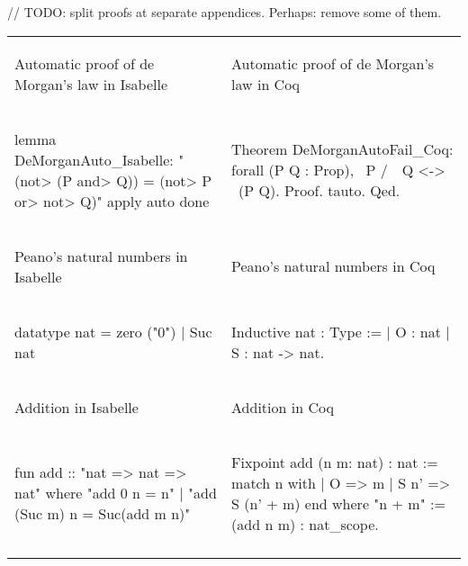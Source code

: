 \documentclass[article]{aaltoseries}
\begin{document}
// TODO: split proofs at separate appendices. Perhaps: remove some of them.

\label{appx_diff_table}

\bgroup
\def\arraystretch{0}%
\begin{tabular}{p{.45\linewidth} p{.45\linewidth}}

\begin{center}Automatic proof of de Morgan's law in Isabelle\end{center}  &  \begin{center}Automatic proof of de Morgan's law in Coq\end{center} \\
\begin{isabelle}
    lemma DeMorganAuto_Isabelle:
    "(\<not> (P \<and> Q)) = (\<not> P \<or> \<not> Q)"
    apply auto
    done
\end{isabelle}
&
\begin{coq}
Theorem DeMorganAutoFail_Coq:
    forall (P Q : Prop), ~P /\ ~Q <-> ~(P \/ Q).
Proof.
    tauto.
Qed.
\end{coq}
\\ \arrayrulecolor{gray}\hline

\begin{center}Peano's natural numbers in Isabelle\end{center}  &  \begin{center}Peano's natural numbers in Coq\end{center} \\
\begin{isabelle}
datatype nat = 
    zero ("0")
    | Suc nat
\end{isabelle}
&
\begin{coq}
Inductive nat : Type :=
    | O : nat
    | S : nat -> nat.
\end{coq}
\\ \arrayrulecolor{gray}\hline


\begin{center}Addition in Isabelle\end{center}  &  \begin{center}Addition in Coq\end{center} \\
\begin{isabelle}
fun add :: "nat => nat => nat"
  where
    "add 0 n = n"
    | "add (Suc m) n = Suc(add m n)"
\end{isabelle}
&
\begin{coq}
Fixpoint add (n m: nat) : nat :=
  match n with
    | O => m
    | S n' => S (n' + m)
  end
where "n + m" := (add n m) : nat_scope.
\end{coq}
\\ \arrayrulecolor{gray}\hline



\end{tabular}
\end{document}
